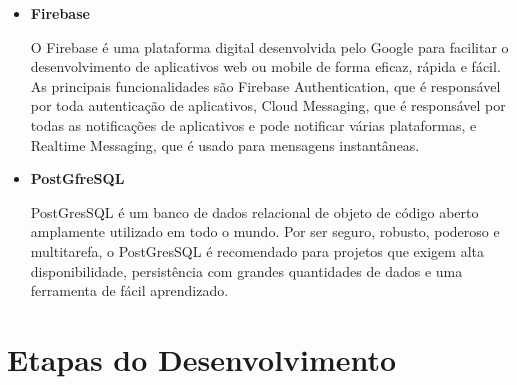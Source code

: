 \begin{itemize}
	\item \textbf{Firebase}
	
	O Firebase é uma plataforma digital desenvolvida pelo Google para facilitar o desenvolvimento de aplicativos web ou mobile de forma eficaz, rápida e fácil. As principais funcionalidades são Firebase Authentication, que é responsável por toda autenticação de aplicativos, Cloud Messaging, que é responsável por todas as notificações de aplicativos e pode notificar várias plataformas, e Realtime Messaging, que é usado para mensagens instantâneas.
	
	\item \textbf{PostGfreSQL}
	
	PostGresSQL é um banco de dados relacional de objeto de código aberto amplamente utilizado em todo o mundo. Por ser seguro, robusto, poderoso e multitarefa, o PostGresSQL é recomendado para projetos que exigem alta disponibilidade, persistência com grandes quantidades de dados e uma ferramenta de fácil aprendizado.
	
	
\end{itemize}


\section{Etapas do Desenvolvimento}

